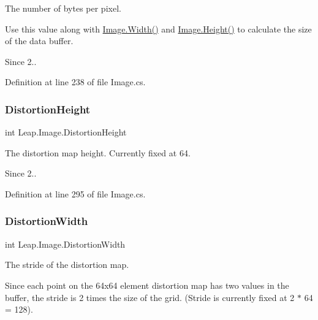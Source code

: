 The number of bytes per pixel. 

Use this value along with \mbox{\hyperlink{class_leap_1_1_image_a66b413ab158bf69102be0a58056a34b6}{Image.\+Width()}} and \mbox{\hyperlink{class_leap_1_1_image_a00971100533a392e69ed78069340954b}{Image.\+Height()}} to calculate the size of the data buffer.

\begin{DoxySince}{Since}
2.. 
\end{DoxySince}


Definition at line 238 of file Image.\+cs.

\mbox{\label{class_leap_1_1_image_a7221f670387ea10e1047a71b251000ea}} 
\subsubsection{\texorpdfstring{DistortionHeight}{DistortionHeight}}
{\footnotesize\ttfamily int Leap.\+Image.\+Distortion\+Height\hspace{0.3cm}{\ttfamily [get]}}



The distortion map height. Currently fixed at 64. 

\begin{DoxySince}{Since}
2.. 
\end{DoxySince}


Definition at line 295 of file Image.\+cs.

\mbox{\label{class_leap_1_1_image_a543d13baf55f8184ee5df4d8be7574fe}} 
\subsubsection{\texorpdfstring{DistortionWidth}{DistortionWidth}}
{\footnotesize\ttfamily int Leap.\+Image.\+Distortion\+Width\hspace{0.3cm}{\ttfamily [get]}}



The stride of the distortion map. 

Since each point on the 64x64 element distortion map has two values in the buffer, the stride is 2 times the size of the grid. (Stride is currently fixed at 2 $\ast$ 64 = 128).

